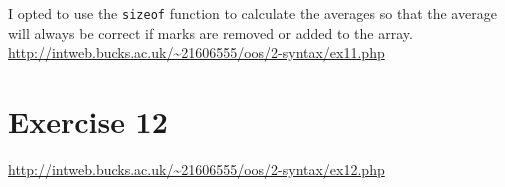 I opted to use the \texttt{sizeof} function to calculate the averages so that the average will always be correct if marks are removed or added to the array.\\

\url{http://intweb.bucks.ac.uk/~21606555/oos/2-syntax/ex11.php}

\captionsetup{type=figure}

\section{Exercise 12}

\url{http://intweb.bucks.ac.uk/~21606555/oos/2-syntax/ex12.php}

\captionsetup{type=figure}
